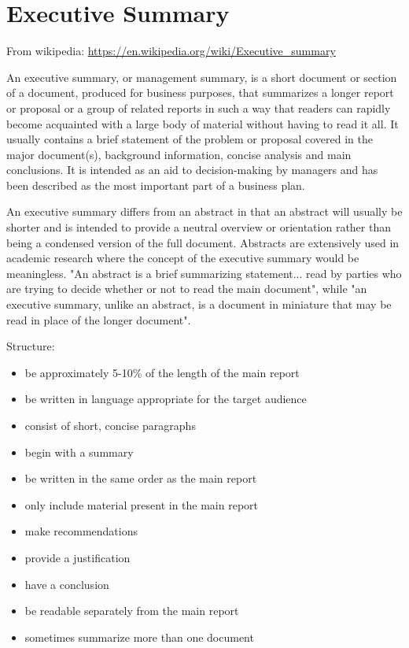 
\chapter*{Executive Summary}
\label{sec:execsum}

From wikipedia: \url{https://en.wikipedia.org/wiki/Executive_summary}

An executive summary, or management summary, is a short document or section of a document, produced for business purposes, that summarizes a longer report or proposal or a group of related reports in such a way that readers can rapidly become acquainted with a large body of material without having to read it all. It usually contains a brief statement of the problem or proposal covered in the major document(s), background information, concise analysis and main conclusions. It is intended as an aid to decision-making by managers and has been described as the most important part of a business plan.

An executive summary differs from an abstract in that an abstract will usually be shorter and is intended to provide a neutral overview or orientation rather than being a condensed version of the full document. Abstracts are extensively used in academic research where the concept of the executive summary would be meaningless. "An abstract is a brief summarizing statement... read by parties who are trying to decide whether or not to read the main document", while "an executive summary, unlike an abstract, is a document in miniature that may be read in place of the longer document".

Structure:
\begin{itemize}
 \item be approximately 5-10\% of the length of the main report
 \item be written in language appropriate for the target audience
 \item consist of short, concise paragraphs
 \item begin with a summary
 \item be written in the same order as the main report
 \item only include material present in the main report
 \item make recommendations
 \item provide a justification
 \item have a conclusion
 \item be readable separately from the main report
 \item sometimes summarize more than one document
\end{itemize}

\clearpage
